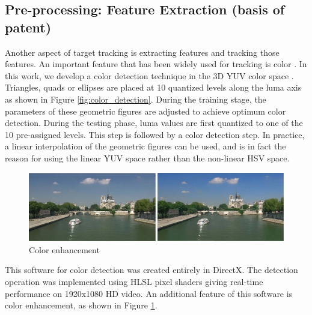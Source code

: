 \documentclass[12pt,letterpaper,doublespaced,ETD,proposal]{gt-ece-thesis}
\begin{document}
\begin{Body}
\subsection{Pre-processing: Feature Extraction (basis of patent)}
Another aspect of target tracking is extracting features and tracking those features.  An important feature that has been widely used for tracking is color \cite{1997_CNF_TRK_Fieguth, 1998_CNF_HeadTracking_Birchfield, 2000_JNL_PersonTracking_Darrell, 2002_JNL_MeanShift_Comaniciu, 2002_CNF_TRKcolor_Perez}.  In this work, we develop a color detection technique in the 3D YUV color space \cite{2008_TECH_3DvideoColorEnhancement_Aslam}.  Triangles, quads or ellipses are placed at 10 quantized levels along the luma axis as shown in Figure \ref{fig:color_detection}.  During the training stage, the parameters of these geometric figures are adjusted to achieve optimum color detection.  During the testing phase, luma values are first quantized to one of the 10 pre-assigned levels.  This step is followed by a color detection step.  In practice, a linear interpolation of the geometric figures can be used, and is in fact the reason for using the linear YUV space rather than the non-linear HSV space.

			
			\begin{figure}		
					\centering		
					\includegraphics[width=1.0\textwidth]{figs/Proposal_fig15_TRK_colorEnhancement}
					\caption{Color enhancement}
					\label{fig:color_enhancement}
			\end{figure}

This software for color detection was created entirely in DirectX.  The detection operation was implemented using HLSL pixel shaders giving real-time performance on 1920x1080 HD video.  An additional feature of this software is color enhancement, as shown in Figure \ref{fig:color_enhancement}.


\end{Body}
\end{document}
